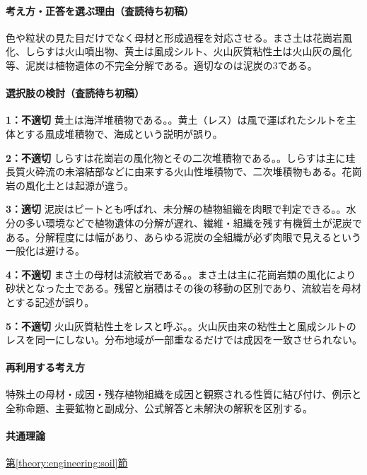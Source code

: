 \paragraph{考え方・正答を選ぶ理由（査読待ち初稿）} 色や粒状の見た目だけでなく母材と形成過程を対応させる。まさ土は花崗岩風化、しらすは火山噴出物、黄土は風成シルト、火山灰質粘性土は火山灰の風化等、泥炭は植物遺体の不完全分解である。適切なのは泥炭の3である。

\paragraph{選択肢の検討（査読待ち初稿）}\mbox{}\par

\noindent\textbf{1：不適切} 黄土は海洋堆積物である。。黄土（レス）は風で運ばれたシルトを主体とする風成堆積物で、海成という説明が誤り。\par

\noindent\textbf{2：不適切} しらすは花崗岩の風化物とその二次堆積物である。。しらすは主に珪長質火砕流の未溶結部などに由来する火山性堆積物で、二次堆積物もある。花崗岩の風化土とは起源が違う。\par

\noindent\textbf{3：適切} 泥炭はピートとも呼ばれ、未分解の植物組織を肉眼で判定できる。。水分の多い環境などで植物遺体の分解が遅れ、繊維・組織を残す有機質土が泥炭である。分解程度には幅があり、あらゆる泥炭の全組織が必ず肉眼で見えるという一般化は避ける。\par

\noindent\textbf{4：不適切} まさ土の母材は流紋岩である。。まさ土は主に花崗岩類の風化により砂状となった土である。残留と崩積はその後の移動の区別であり、流紋岩を母材とする記述が誤り。\par

\noindent\textbf{5：不適切} 火山灰質粘性土をレスと呼ぶ。。火山灰由来の粘性土と風成シルトのレスを同一にしない。分布地域が一部重なるだけでは成因を一致させられない。\par

\paragraph{再利用する考え方} 特殊土の母材・成因・残存植物組織を成因と観察される性質に結び付け、例示と全称命題、主要鉱物と副成分、公式解答と未解決の解釈を区別する。

\paragraph{共通理論} \hyperref[theory:engineering:soil]{第\ref*{theory:engineering:soil}節}

